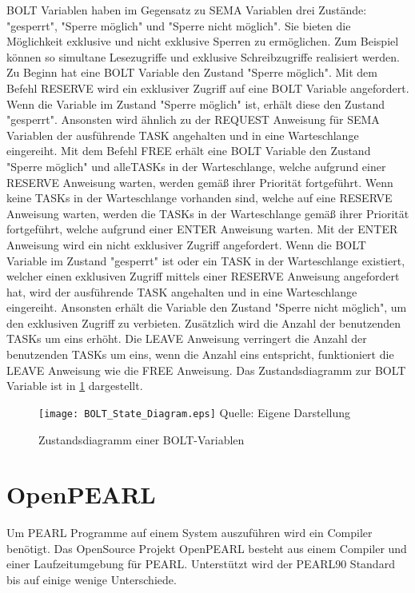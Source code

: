 \textrm{BOLT} Variablen haben im Gegensatz zu \textrm{SEMA} Variablen drei
Zustände: "gesperrt", "Sperre möglich" und "Sperre nicht
möglich".\autocite[vgl.][125]{PEARL} Sie bieten die Möglichkeit exklusive und
nicht exklusive Sperren zu ermöglichen. Zum Beispiel können so simultane
Lesezugriffe und exklusive Schreibzugriffe realisiert werden. Zu Beginn hat eine
\textrm{BOLT} Variable den Zustand "Sperre möglich". Mit dem Befehl \textrm{RESERVE}
wird ein exklusiver Zugriff auf eine \textrm{BOLT} Variable angefordert. Wenn
die Variable im Zustand "Sperre möglich" ist, erhält diese den Zustand
"gesperrt". Ansonsten wird ähnlich zu der \textrm{REQUEST} Anweisung für
\textrm{SEMA} Variablen der ausführende \textrm{TASK} angehalten und in eine
Warteschlange eingereiht. Mit dem Befehl \textrm{FREE} erhält eine \textrm{BOLT}
Variable den Zustand "Sperre möglich" und alle\textrm{TASKs} in der
Warteschlange, welche aufgrund einer \textrm{RESERVE} Anweisung warten, werden
gemäß ihrer Priorität fortgeführt. Wenn keine \textrm{TASKs} in der
Warteschlange vorhanden sind, welche auf eine \textrm{RESERVE} Anweisung warten,
werden die \textrm{TASKs} in der Warteschlange gemäß ihrer Priorität
fortgeführt, welche aufgrund einer \textrm{ENTER} Anweisung warten. Mit der
\textrm{ENTER} Anweisung wird ein nicht exklusiver Zugriff angefordert. Wenn die
\textrm{BOLT} Variable im Zustand "gesperrt" ist oder ein \textrm{TASK} in der
Warteschlange existiert, welcher einen exklusiven Zugriff mittels einer
\textrm{RESERVE} Anweisung angefordert hat, wird der ausführende \textrm{TASK}
angehalten und in eine Warteschlange eingereiht. Ansonsten erhält die Variable
den Zustand "Sperre nicht möglich", um den exklusiven Zugriff zu verbieten.
Zusätzlich wird die Anzahl der benutzenden \textrm{TASKs} um eins erhöht. Die
\textrm{LEAVE} Anweisung verringert die Anzahl der benutzenden \textrm{TASKs} um
eins, wenn die Anzahl eins entspricht, funktioniert die
\textrm{LEAVE} Anweisung wie die \textrm{FREE}
Anweisung.\autocite[vgl.][125-127]{PEARL} Das Zustandsdiagramm zur \textrm{BOLT}
Variable ist in \cref{fig:BOLT_StateDiagram} dargestellt.
\begin{figure}[ht]
  \texttt{[image: BOLT\_State\_Diagram.eps]}
  \footnotesize\sffamily Quelle: Eigene Darstellung
  \caption{Zustandsdiagramm einer BOLT-Variablen}
  \label{fig:BOLT_StateDiagram}
\end{figure}

\section{OpenPEARL}
\label{section:OpenPEARL}
Um PEARL Programme auf einem System auszuführen wird ein Compiler benötigt. Das
OpenSource Projekt OpenPEARL besteht aus einem Compiler und einer
Laufzeitumgebung für PEARL.\autocite{OpenPEARL_Structure} Unterstützt wird der
PEARL90 Standard bis auf einige wenige
Unterschiede.\autocite{OpenPEARL_Differences_To_PEARL90}

